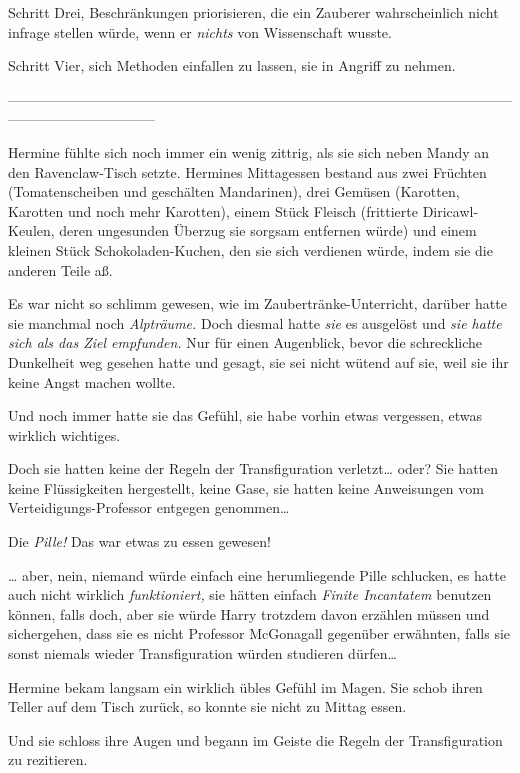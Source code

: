 {Schritt Drei, Beschränkungen priorisieren, die ein Zauberer wahrscheinlich nicht infrage stellen würde, wenn er \emph{nichts} von Wissenschaft wusste.

Schritt Vier, sich Methoden einfallen zu lassen, sie in Angriff zu nehmen.

--------------------------------------------------------------------------------------------------------------------------------------------

Hermine fühlte sich noch immer ein wenig zittrig, als sie sich neben Mandy an den Ravenclaw-Tisch setzte. Hermines Mittagessen bestand aus zwei Früchten (Tomatenscheiben und geschälten Mandarinen), drei Gemüsen (Karotten, Karotten und noch mehr Karotten), einem Stück Fleisch (frittierte Diricawl-Keulen, deren ungesunden Überzug sie sorgsam entfernen würde) und einem kleinen Stück Schokoladen-Kuchen, den sie sich verdienen würde, indem sie die anderen Teile aß.

Es war nicht so schlimm gewesen, wie im Zaubertränke-Unterricht, darüber hatte sie manchmal noch \emph{Alpträume.} Doch diesmal hatte \emph{sie} es ausgelöst und \emph{sie hatte sich als das Ziel empfunden.} Nur für einen Augenblick, bevor die schreckliche Dunkelheit weg gesehen hatte und gesagt, sie sei nicht wütend auf sie, weil sie ihr keine Angst machen wollte.

Und noch immer hatte sie das Gefühl, sie habe vorhin etwas vergessen, etwas wirklich wichtiges.

Doch sie hatten keine der Regeln der Transfiguration verletzt… oder? Sie hatten keine Flüssigkeiten hergestellt, keine Gase, sie hatten keine Anweisungen vom Verteidigungs-Professor entgegen genommen…

Die \emph{Pille!} Das war etwas zu essen gewesen!

… aber, nein, niemand würde einfach eine herumliegende Pille schlucken, es hatte auch nicht wirklich \emph{funktioniert,} sie hätten einfach \emph{Finite Incantatem} benutzen können, falls doch, aber sie würde Harry trotzdem davon erzählen müssen und sichergehen, dass sie es nicht Professor McGonagall gegenüber erwähnten, falls sie sonst niemals wieder Transfiguration würden studieren dürfen…

Hermine bekam langsam ein wirklich übles Gefühl im Magen. Sie schob ihren Teller auf dem Tisch zurück, so konnte sie nicht zu Mittag essen.

Und sie schloss ihre Augen und begann im Geiste die Regeln der Transfiguration zu rezitieren.

}
